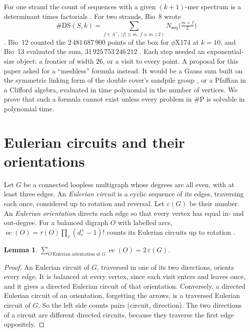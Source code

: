 \documentclass[11pt]{article}
\theoremstyle{plain}
\newtheorem{lemma}[theorem]{Lemma}
\theoremstyle{definition}
\theoremstyle{remark}
\newcommand{\DS}{\mathrm{DS}}
\newcommand{\Lm}{\Lambda^{-}}
\newcommand{\Nseq}{N_{\mathrm{seq}}}
\newcommand{\ec}{\operatorname{ec}}
\newcommand{\sP}{\#\mathrm{P}}
\begin{document}
For one strand the count of sequences with a given $(k+1)$-mer spectrum is a determinant times
factorials \cite{BEST}. For two strands, Bio~8 wrote
\[
\#\DS(S,k)=\sum_{f\in\Lm,\ |f|\le m,\ f\equiv m\ (2)}\Nseq\bigl(\tfrac{m+f}2\bigr)
\]
\cite{Bio8}. Bio~12 counted the $2\,481\,687\,900$ points of the box for $\phi$X174 at $k=10$, and Bio~13
evaluated the sum, $31\,925\,753\,246\,212$ \cite{Bio12,Bio13}. Each step needed an exponential-size
object: a frontier of width $26$, or a visit to every point. A proposal for this paper asked for a
``meshless'' formula instead. It would be a Gauss sum built on the symmetric linking form of the double
cover's sandpile group \cite[Rem.~5]{Bio7}, or a Pfaffian in a Clifford algebra, evaluated in time polynomial in the
number of vertices. We prove that such a formula cannot exist unless every problem in $\sP$ is solvable
in polynomial time.

\section{Eulerian circuits and their orientations}\label{sec:euler}

Let $G$ be a connected loopless multigraph whose degrees are all even, with at least three edges. An
\emph{Eulerian circuit} is a cyclic sequence of its edges, traversing each once, considered up to
rotation and reversal. Let $\varepsilon(G)$ be their number. An \emph{Eulerian orientation} directs
each edge so that every vertex has equal in- and out-degree. For a balanced digraph $O$ with labelled
arcs, $\ec(O)=\tau(O)\prod_v(d^+_v-1)!$ counts its Eulerian circuits up to rotation \cite{BEST}.

\begin{lemma}\label{lem:orient}
$\displaystyle\sum_{O\ \text{Eulerian orientation of }G}\ec(O)=2\,\varepsilon(G)$.
\end{lemma}

\begin{proof}
An Eulerian circuit of $G$, traversed in one of its two directions, orients every edge. It is balanced at
every vertex, since each visit enters and leaves once, and it gives a directed Eulerian circuit of that
orientation. Conversely, a directed Eulerian circuit of an orientation, forgetting the arrows, is a
traversed Eulerian circuit of $G$. So the left side counts pairs (circuit, direction). The two directions
of a circuit are different directed circuits, because they traverse the first edge oppositely.
\end{proof}
\end{document}
